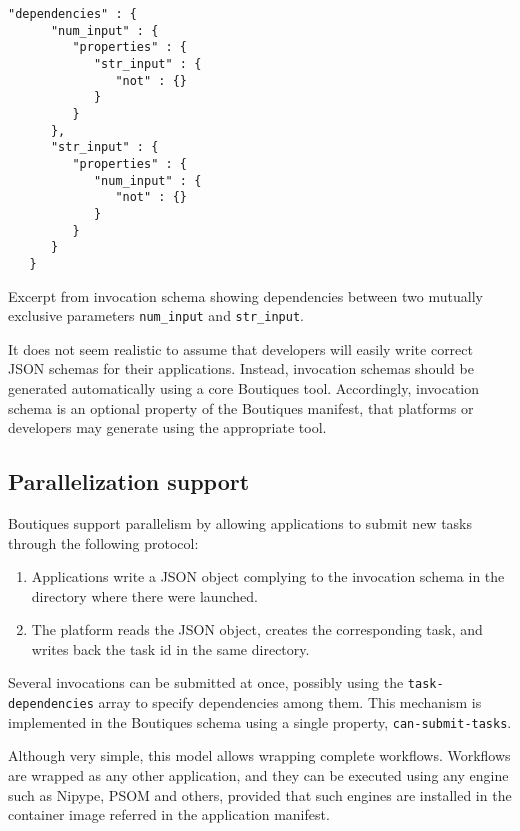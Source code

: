 \documentclass{article}
\begin{document}
\begin{listing}
\begin{verbatim}
"dependencies" : {
      "num_input" : {
         "properties" : {
            "str_input" : {
               "not" : {}
            }
         }
      },
      "str_input" : {
         "properties" : {
            "num_input" : {
               "not" : {}
            }
         }
      }
   }
\end{verbatim}
\caption{Excerpt from invocation schema showing dependencies between
  two mutually exclusive parameters \texttt{num\_input} and
  \texttt{str\_input}.}
\label{listing:invocation-schema-example}
\end{listing}


It does not seem realistic to assume that developers will easily write
correct JSON schemas for their applications. Instead, invocation
schemas should be generated automatically using a core Boutiques
tool. Accordingly, invocation schema is an optional property of the
Boutiques manifest, that platforms or developers may generate using
the appropriate tool.

\subsection{Parallelization support}
\label{sec:parallelization}
Boutiques support parallelism by allowing applications to submit new
tasks through the following protocol:
\begin{enumerate}
\item Applications write a JSON object complying to the invocation
  schema in the directory where there were launched.
\item The platform reads the JSON object, creates the corresponding
  task, and writes back the task id in the same directory.
\end{enumerate}
Several invocations can be submitted at once, possibly using the
\texttt{task-dependencies} array to specify dependencies among
them. This mechanism is implemented in the Boutiques schema using a
single property, \texttt{can-submit-tasks}.

Although very simple, this model allows wrapping complete
workflows. Workflows are wrapped as any other application, and they
can be executed using any engine such as Nipype, PSOM and others,
provided that such engines are installed in the container image
referred in the application manifest. 
\end{document}
